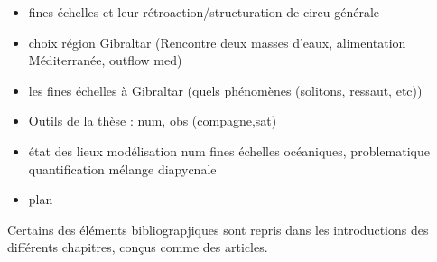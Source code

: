 \hypersetup{pdfborder=0 0 0}


\begin{itemize}
\item fines échelles et leur rétroaction/structuration de circu générale
\item choix région Gibraltar (Rencontre deux masses d'eaux, alimentation Méditerranée, outflow med)
\item les fines échelles à Gibraltar (quels phénomènes (solitons, ressaut, etc))
\item Outils de la thèse : num, obs (compagne,sat)
\item état des lieux modélisation num fines échelles océaniques, problematique quantification mélange diapycnale
\item plan
\end{itemize}

Certains des éléments bibliograpjiques sont repris dans les introductions des différents chapitres, conçus comme des articles.
